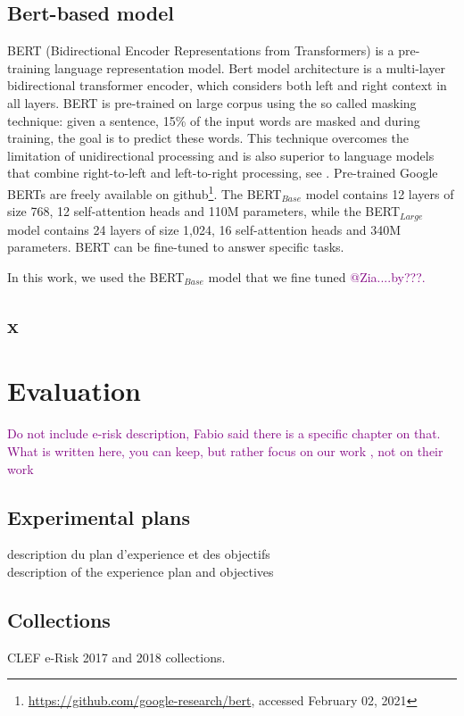 \documentclass[graybox]{svmult}
\newcommand{\jm}[1]{\textcolor{purple}{{  #1}}}
\begin{document}
\subsection{Bert-based model}
BERT (Bidirectional Encoder Representations from Transformers) is a pre-training language representation model. Bert model architecture is a multi-layer bidirectional transformer encoder, which considers both left and right context in all layers. BERT is pre-trained on large corpus using the so called masking technique: given a sentence, 15\% of the input words are masked and during training, the goal is to predict these words. This technique overcomes the limitation of unidirectional processing and is also superior to language models that combine right-to-left and left-to-right processing, see  \cite{PetersNIGCLZ18}.  Pre-trained  Google BERTs are freely available on github\footnote{\url{https://github.com/google-research/bert}, accessed February 02, 2021}. The BERT$_{Base}$ model contains 12 layers of size 768, 12 self-attention heads and 110M parameters, while the BERT$_{Large}$ model contains 24 layers of size 1,024, 16 self-attention heads and 340M parameters. BERT can be fine-tuned to answer specific tasks.

In this work, we used the BERT$_{Base}$ model that we fine tuned \jm{@Zia....by???.}




\subsection{x}
\section{Evaluation}

\jm{Do not include e-risk description, Fabio said there is a specific chapter on that. What is written here, you can keep, but rather focus on our work , not on their work}

\subsection{Experimental plans}
description du plan d'experience et des objectifs\\
description of the experience plan and objectives

\subsection{Collections}
CLEF e-Risk 2017 and 2018 collections.
\end{document}
